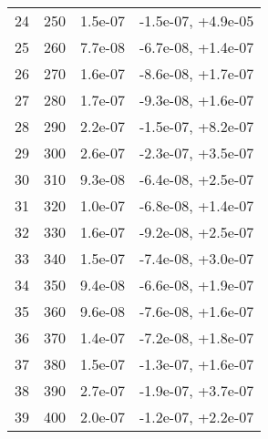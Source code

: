 \begin{table}
\begin{adjustbox}{width=1\textwidth/2}
\begin{tabular}{|c|c|c|c|}
\cline{1-4}
24 & 250 & 1.5e-07 & -1.5e-07, +4.9e-05 \\
\cline{1-4}
25 & 260 & 7.7e-08 & -6.7e-08, +1.4e-07 \\
\cline{1-4}
26 & 270 & 1.6e-07 & -8.6e-08, +1.7e-07 \\
\cline{1-4}
27 & 280 & 1.7e-07 & -9.3e-08, +1.6e-07 \\
\cline{1-4}
28 & 290 & 2.2e-07 & -1.5e-07, +8.2e-07 \\
\cline{1-4}
29 & 300 & 2.6e-07 & -2.3e-07, +3.5e-07 \\
\cline{1-4}
30 & 310 & 9.3e-08 & -6.4e-08, +2.5e-07 \\
\cline{1-4}
31 & 320 & 1.0e-07 & -6.8e-08, +1.4e-07 \\
\cline{1-4}
32 & 330 & 1.6e-07 & -9.2e-08, +2.5e-07 \\
\cline{1-4}
33 & 340 & 1.5e-07 & -7.4e-08, +3.0e-07 \\
\cline{1-4}
34 & 350 & 9.4e-08 & -6.6e-08, +1.9e-07 \\
\cline{1-4}
35 & 360 & 9.6e-08 & -7.6e-08, +1.6e-07 \\
\cline{1-4}
36 & 370 & 1.4e-07 & -7.2e-08, +1.8e-07 \\
\cline{1-4}
37 & 380 & 1.5e-07 & -1.3e-07, +1.6e-07 \\
\cline{1-4}
38 & 390 & 2.7e-07 & -1.9e-07, +3.7e-07 \\
\cline{1-4}
39 & 400 & 2.0e-07 & -1.2e-07, +2.2e-07 \\
\cline{1-4}
\end{tabular}
\end{adjustbox}
\end{table}

